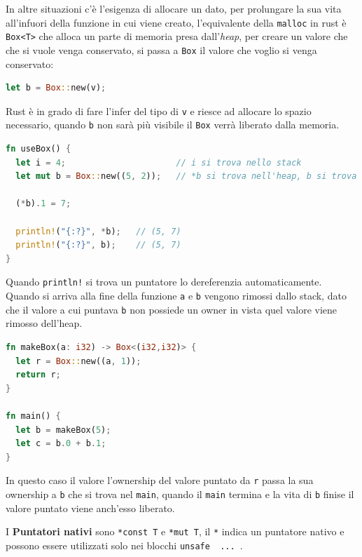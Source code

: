 \documentclass[12pt]{article}
\begin{document}
In altre situazioni c'\`e l'esigenza di allocare un dato, per prolungare la sua vita all'infuori della funzione in cui viene creato, l'equivalente della \texttt{malloc} in rust \`e \texttt{Box<T>} che alloca un parte di memoria presa dall'\emph{heap}, per creare un valore che che si vuole venga conservato, si passa a \texttt{Box} il valore che voglio si venga conservato:
\begin{lstlisting}[language=rust]
let b = Box::new(v);
\end{lstlisting}
Rust \`e in grado di fare l'infer del tipo di \texttt{v} e riesce ad allocare lo spazio necessario, quando \texttt{b} non sar\`a pi\`u visibile il \texttt{Box} verr\`a liberato dalla memoria.
\begin{lstlisting}[language=rust]
fn useBox() {
  let i = 4;                      // i si trova nello stack
  let mut b = Box::new((5, 2));   // *b si trova nell'heap, b si trova nello stack

  (*b).1 = 7;

  println!("{:?}", *b);   // (5, 7)
  println!("{:?}", b);    // (5, 7)
}
\end{lstlisting}
Quando \texttt{println!} si trova un puntatore lo dereferenzia automaticamente. Quando si arriva alla fine della funzione \texttt{a} e \texttt{b} vengono rimossi dallo stack, dato che il valore a cui puntava \texttt{b} non possiede un owner in vista quel valore viene rimosso dell'heap.
\begin{lstlisting}[language=rust]
fn makeBox(a: i32) -> Box<(i32,i32)> {
  let r = Box::new((a, 1));
  return r;
}

fn main() {
  let b = makeBox(5);
  let c = b.0 + b.1;
}
\end{lstlisting}
In questo caso il valore l'ownership del valore puntato da \texttt{r} passa la sua ownership a \texttt{b} che si trova nel \texttt{main}, quando il \texttt{main} termina e la vita di \texttt{b} finise il valore puntato viene anch'esso liberato.

I \textbf{Puntatori nativi} sono \texttt{*const T} e \texttt{*mut T}, il \texttt{*} indica un puntatore nativo e possono essere utilizzati solo nei blocchi \texttt{unsafe { ... }}.
\end{document}
